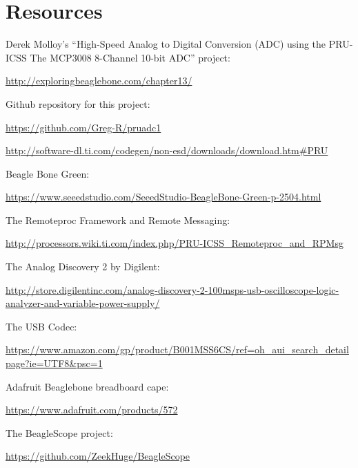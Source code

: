 %
%
%

\chapter{Resources}

Derek Molloy's ``High-Speed Analog to Digital Conversion (ADC) using the PRU-ICSS
The MCP3008 8-Channel 10-bit ADC'' project:

\url{http://exploringbeaglebone.com/chapter13/}


Github repository for this project:

\url{https://github.com/Greg-R/pruadc1}

\url{http://software-dl.ti.com/codegen/non-esd/downloads/download.htm#PRU}

Beagle Bone Green:

\url{https://www.seeedstudio.com/SeeedStudio-BeagleBone-Green-p-2504.html}

The Remoteproc Framework and Remote Messaging:

\url{http://processors.wiki.ti.com/index.php/PRU-ICSS_Remoteproc_and_RPMsg}

The Analog Discovery 2 by Digilent:

{\scriptsize \url{http://store.digilentinc.com/analog-discovery-2-100msps-usb-oscilloscope-logic-analyzer-and-variable-power-supply/}}

The USB Codec:

\url{https://www.amazon.com/gp/product/B001MSS6CS/ref=oh_aui_search_detailpage?ie=UTF8&psc=1}

Adafruit Beaglebone breadboard cape:

\url{https://www.adafruit.com/products/572}

The BeagleScope project:

\url{https://github.com/ZeekHuge/BeagleScope}
